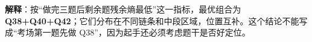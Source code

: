 \textbf{解释}：按“做完三题后剩余题残余熵最低”这一指标，最优组合为\textbf{Q38+Q40+Q42}；它们分布在不同链条和中段区域，位置互补。这个结论不能写成“考场第一题先做 Q38”，因为起手还必须考虑题干是否好定位。